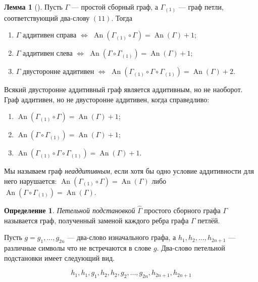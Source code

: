 \documentclass{article}
\theoremstyle{definition}
\newtheorem{definition}[theorem]{Определение}
\newtheorem{lemma}[theorem]{Лемма}
\newcommand{\An}{\operatorname{An}}
\newcommand{\hGamma}{\hat{\Gamma}}
\begin{document}
\begin{lemma}[{\cite[Лемма 2.3.6]{Muche2012}}]\label{lem:additivity-criterion}
    Пусть $\Gamma$ — простой сборный граф, а $\Gamma_{(1)}$ — граф петли, соответствующий два-слову $(11)$. Тогда
    \begin{enumerate}
        \item $\Gamma$ аддитивен справа $\iff$ $\An(\Gamma_{(1)} \circ \Gamma) = \An(\Gamma) + 1$;
        \item $\Gamma$ аддитивен слева $\iff$ $\An(\Gamma \circ \Gamma_{(1)}) = \An(\Gamma) + 1$;
        \item $\Gamma$ двусторонне аддитивен $\iff$ $\An(\Gamma_{(1)} \circ \Gamma \circ \Gamma_{(1)}) = \An(\Gamma) + 2$.
    \end{enumerate}
\end{lemma}

Всякий двусторонне аддитивный граф является аддитивным, но не наоборот. Граф аддитивен, но не двусторонне аддитивен, когда справедливо:

\begin{enumerate}
    \item $\An(\Gamma_{(1)} \circ \Gamma) = \An(\Gamma) + 1$;
    \item $\An(\Gamma \circ \Gamma_{(1)}) = \An(\Gamma) + 1$;
    \item $\An(\Gamma_{(1)} \circ \Gamma \circ \Gamma_{(1)}) = \An(\Gamma) + 1$.
\end{enumerate}

Мы называем граф \emph{неаддитивным}, если хотя бы одно условие аддитивности для него нарушается: $\An(\Gamma_{(1)} \circ \Gamma) = \An(\Gamma)$ либо $\An(\Gamma \circ \Gamma_{(1)}) = \An(\Gamma)$.

\begin{definition}
	\emph{Петельной подстановкой} $\hGamma$ простого сборного графа $\Gamma$ называется граф, полученный заменой каждого ребра графа $\Gamma$ петлёй. 
    
    Пусть $g = g_1, ..., g_{2n}$ --- два-слово изначального графа, а $h_1,h_2,...,h_{2n+1}$ --- различные символы что не встречаются в слове $g$. Два-слово петельной подстановки имеет следующий вид.

    \[
    h_1,h_1,g_1,h_2,h_2,g_2,...,g_{2n},h_{2n + 1},h_{2n + 1}
    \]
\end{definition}
\end{document}
